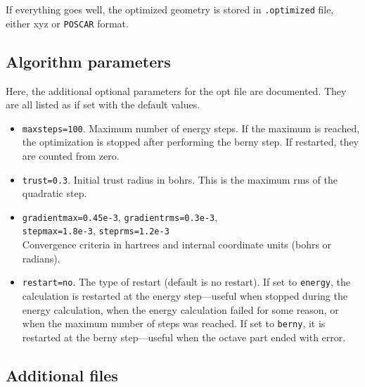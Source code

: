 \documentclass[12pt,a4]{article}
\newcommand{\ttt}{\texttt}
\begin{document}
If everything goes well, the optimized geometry is stored in \ttt{.optimized} file, either xyz or \ttt{POSCAR} format.

\subsection{Algorithm parameters}\label{switches}

Here, the additional optional parameters for the opt file are documented. They are all listed as if set with the default values.

\begin{itemize}
\item \ttt{maxsteps=100}. Maximum number of energy steps. If the maximum is reached, the optimization is stopped after performing the berny step. If restarted, they are counted from zero. 
\item \ttt{trust=0.3}. Initial trust radius in bohrs. This is the maximum rms of the quadratic step.
\item \ttt{gradientmax=0.45e-3}, \ttt{gradientrms=0.3e-3},\\
\ttt{stepmax=1.8e-3}, \ttt{steprms=1.2e-3}\\
Convergence criteria in hartrees and internal coordinate units (bohrs or radians).
\item \ttt{restart=no}. The type of restart (default is no restart). If set to \ttt{energy}, the calculation is restarted at the energy step---useful when stopped during the energy calculation, when the energy calculation failed for some reason, or when the maximum number of steps was reached. If set to \ttt{berny}, it is restarted at the berny step---useful when the octave part ended with error.
\end{itemize}

\subsection{Additional files}
\end{document}

